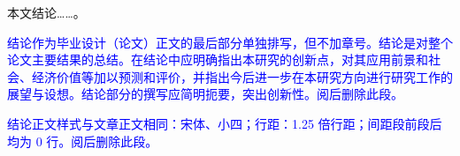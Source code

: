 %
%
%
%
%

\begin{conclusion}

  本文结论……。

  \textcolor{blue}{结论作为毕业设计（论文）正文的最后部分单独排写，但不加章号。结论是对整个论文主要结果的总结。在结论中应明确指出本研究的创新点，对其应用前景和社会、经济价值等加以预测和评价，并指出今后进一步在本研究方向进行研究工作的展望与设想。结论部分的撰写应简明扼要，突出创新性。阅后删除此段。}

  \textcolor{blue}{结论正文样式与文章正文相同：宋体、小四；行距：1.25 倍行距；间距段前段后均为 0 行。阅后删除此段。}
\end{conclusion}

